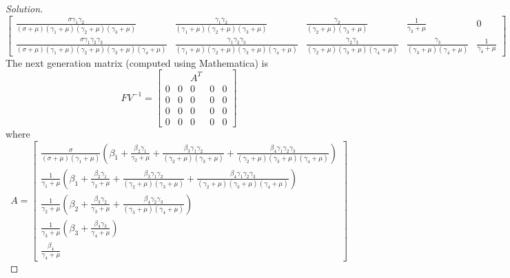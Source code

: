 \documentclass[12pt]{article}\usepackage[]{graphicx}\usepackage[]{color}
\begin{document}
\begin{enumerate}[(a)]
{\begin{proof}[Solution]
{\[\begin{bmatrix}
  \frac{\sigma \gamma_1 \gamma_2}{(\sigma + \mu)(\gamma_1+\mu)(\gamma_2+\mu)(\gamma_3+\mu)} & \frac{\gamma_1 \gamma_2}{(\gamma_1+\mu)(\gamma_2+\mu)(\gamma_3+\mu)} & \frac{\gamma_2}{(\gamma_2+\mu)(\gamma_3+\mu)} & \frac{1}{\gamma_3+\mu} & 0 \\
  
  \frac{\sigma \gamma_1 \gamma_2 \gamma_3}{(\sigma + \mu)(\gamma_1+\mu)(\gamma_2+\mu)(\gamma_3+\mu)(\gamma_4+\mu)} & \frac{\gamma_1 \gamma_2 \gamma_3}{(\gamma_1+\mu)(\gamma_2+\mu)(\gamma_3+\mu)(\gamma_4+\mu)} & \frac{\gamma_2 \gamma_3}{(\gamma_2+\mu)(\gamma_3+\mu)(\gamma_4+\mu)} & \frac{\gamma_3}{(\gamma_3+\mu)(\gamma_4+\mu)} & \frac{1}{\gamma_4+\mu} 
\end{bmatrix}
\]
The next generation matrix (computed using Mathematica) is 
\[
FV^{-1}= 
\begin{bmatrix}
  & & A^T
  \\
  0 & 0 & 0 & 0 & 0 \\
  0 & 0 & 0 & 0 & 0 \\
  0 & 0 & 0 & 0 & 0 \\
  0 & 0 & 0 & 0 & 0 
\end{bmatrix}
\]
where 
\[
A = 
\begin{bmatrix}
  \frac{\sigma}{(\sigma + \mu)(\gamma_1+\mu)} \left ( \beta_1 + \frac{\beta_2 \gamma_1}{\gamma_2+\mu} + \frac{\beta_3 \gamma_1\gamma_2}{(\gamma_2+\mu)(\gamma_3+\mu)} + \frac{\beta_4 \gamma_1\gamma_2\gamma_3}{(\gamma_2+\mu)(\gamma_3+\mu)(\gamma_4+\mu)} \right )
  \\ 
  \frac{1}{\gamma_1+\mu} \left ( \beta_1 + \frac{\beta_2 \gamma_1}{\gamma_2+\mu} + \frac{\beta_3 \gamma_1\gamma_2}{(\gamma_2+\mu)(\gamma_3+\mu)} + \frac{\beta_4 \gamma_1\gamma_2\gamma_3}{(\gamma_2+\mu)(\gamma_3+\mu)(\gamma_4+\mu)} \right )
  \\ 
  \frac{1}{\gamma_2+\mu} \left ( \beta_2 + \frac{\beta_3 \gamma_2}{\gamma_3+\mu} + \frac{\beta_4 \gamma_2\gamma_3}{(\gamma_3+\mu)(\gamma_4+\mu)}  \right )
  \\
  \frac{1}{\gamma_3+\mu} \left ( \beta_3  + \frac{\beta_4 \gamma_3}{\gamma_4+\mu}  \right )
  \\
  \frac{\beta_4}{\gamma_4+\mu}

\end{bmatrix}
\]

}
\end{proof}}
\end{enumerate}
\end{document}
